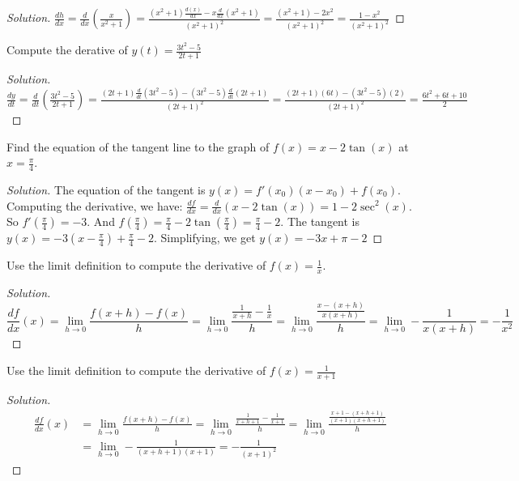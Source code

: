 \documentclass[crop=false,class=book]{standalone}
\begin{document}
\begin{proof}[Solution]
$\frac{dh}{dx}=\frac{d}{dx}(\frac{x}{x^{2}+1})=\frac{(x^{2}+1)\frac{d(x)}{dx}-x\frac{d}{dx}(x^{2}+1)}{(x^{2}+1)^{2}}=\frac{(x^{2}+1)-2x^{2}}{(x^{2}+1)^{2}}=\frac{1-x^{2}}{(x^{2}+1)^{2}}$
\end{proof}
\begin{problem}
Compute the derative of $y(t)=\frac{3t^{2}-5}{2t+1}$
\end{problem}
\begin{proof}[Solution]
$\frac{dy}{dt}=\frac{d}{dt}(\frac{3t^{2}-5}{2t+1})=\frac{(2t+1)\frac{d}{dt}(3t^{2}-5)-(3t^{2}-5)\frac{d}{dt}(2t+1)}{(2t+1)^{2}}=\frac{(2t+1)(6t)-(3t^{2}-5)(2)}{(2t+1)^{2}}=\frac{6t^{2}+6t+10}{2}$
\end{proof}
\begin{problem}
Find the equation of the tangent line to the graph of $f(x)=x-2\tan(x)$ at $x=\frac{\pi}{4}$.
\end{problem}
\begin{proof}[Solution]
The equation of the tangent is $y(x)=f'(x_{0})(x-x_{0})+f(x_{0})$. Computing the derivative, we have: $\frac{df}{dx}=\frac{d}{dx}(x-2\tan(x))=1-2\sec^{2}(x)$. So $f'(\frac{\pi}{4})=-3$. And $f(\frac{\pi}{4})=\frac{\pi}{4}-2\tan(\frac{\pi}{4})=\frac{\pi}{4}-2$. The tangent is $y(x)=-3(x-\frac{\pi}{4})+\frac{\pi}{4}-2$. Simplifying, we get $y(x)=-3x+\pi-2$
\end{proof}
\newpage
\begin{problem}
Use the limit definition to compute the derivative of $f(x)=\frac{1}{x}$.
\end{problem}
\begin{proof}[Solution]
\begin{equation*}
    \frac{df}{dx}(x)=\underset{h\rightarrow 0}{\lim}\frac{f(x+h)-f(x)}{h}=\underset{h\rightarrow 0}{\lim}\frac{\frac{1}{x+h}-\frac{1}{x}}{h}=\underset{h\rightarrow 0}{\lim}\frac{\frac{x-(x+h)}{x(x+h)}}{h}=\underset{h\rightarrow 0}{\lim}-\frac{1}{x(x+h)}=-\frac{1}{x^{2}}
\end{equation*}
\end{proof}
\begin{problem}
Use the limit definition to compute the derivative of $f(x)=\frac{1}{x+1}$
\end{problem}
\begin{proof}[Solution]
\begin{align*}
    \frac{df}{dx}(x)&=\underset{h\rightarrow 0}{\lim}\frac{f(x+h)-f(x)}{h}=\underset{h\rightarrow 0}{\lim}\frac{\frac{1}{x+h+1}-\frac{1}{x+1}}{h}=\underset{h\rightarrow 0}{\lim}\frac{\frac{x+1-(x+h+1)}{(x+1)(x+h+1)}}{h}\\
    &=\underset{h\rightarrow 0}{\lim}-\frac{1}{(x+h+1)(x+1)}=-\frac{1}{(x+1)^{2}}
\end{align*}
\end{proof}
\end{document}
